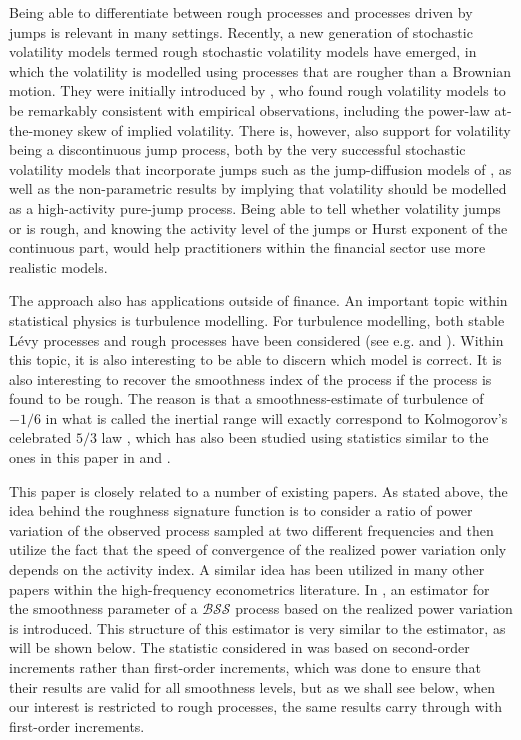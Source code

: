 \documentclass[fleqn,11pt,letterpaper]{article}
\theoremstyle{plain}
\theoremstyle{definition}
\theoremstyle{remark}
\numberwithin{equation}{section}
\begin{document}
Being able to differentiate between rough processes and processes driven by jumps is relevant in many settings. Recently, a new generation of stochastic volatility models termed rough stochastic volatility models have emerged, in which the volatility is modelled using processes that are rougher than a Brownian motion. They were initially introduced by \cite{Gatheral2018}, who found rough volatility models to be remarkably consistent with empirical observations, including the power-law at-the-money skew of implied volatility. There is, however, also support for volatility being a discontinuous jump process, both by the very successful stochastic volatility models that incorporate jumps such as the jump-diffusion models of \cite{Duffie2000}, as well as the non-parametric results by \cite{Todorov2011} implying that volatility should be modelled as a high-activity pure-jump process. Being able to tell whether volatility jumps or is rough, and knowing the activity level of the jumps or Hurst exponent of the continuous part, would help practitioners within the financial sector use more realistic models. 

The approach also has applications outside of finance. An important topic within statistical physics is turbulence modelling. For turbulence modelling, both stable Lévy processes and rough processes have been considered (see e.g. \cite{Takayasu1984} and \cite{Corcuera2013}). Within this topic, it is also interesting to be able to discern which model is correct. It is also interesting to recover the smoothness index of the process if the process is found to be rough. The reason is that a smoothness-estimate of turbulence of $-1/6$ in what is called the inertial range will exactly correspond to Kolmogorov's celebrated $5/3$ law \citep{Kolmogorov1941a,Kolmogorov1941b}, which has also been studied using statistics similar to the ones in this paper in  \cite{Bennedsen2020} and \cite{Corcuera2013}.

This paper is closely related to a number of existing papers. As stated above, the idea behind the roughness signature function is to consider a ratio of power variation of the observed process sampled at two different frequencies and then utilize the fact that the speed of convergence of the realized power variation only depends on the activity index. A similar idea has been utilized in many other papers within the high-frequency econometrics literature.  In  \cite{Corcuera2013}, an estimator for the smoothness parameter of a $\mathcal{BSS}$ process based on the realized power variation is introduced. This structure of this estimator is very similar to the \cite{Todorov2010} estimator, as will be shown below. The statistic considered in \cite{Corcuera2013} was based on second-order increments rather than first-order increments, which was done to ensure that their results are valid for all smoothness levels, but as we shall see below, when our interest is restricted to rough processes, the same results carry through with first-order increments. 
\end{document}

